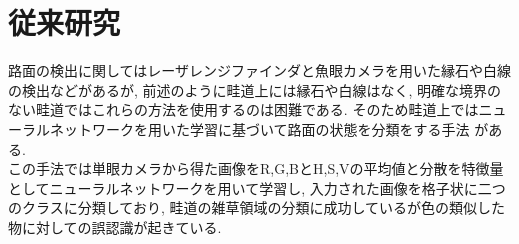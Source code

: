 \section{従来研究}
路面の検出に関してはレーザレンジファインダと魚眼カメラを用いた縁石や白線の検出\cite{土谷千加夫2015自律走行のための白線と縁石に基づく自己位置推定}などがあるが, 
前述のように畦道上には縁石や白線はなく, 明確な境界のない畦道ではこれらの方法を使用するのは困難である. 
そのため畦道上ではニューラルネットワークを用いた学習に基づいて路面の状態を分類をする手法
\cite{長橋孝哉2019ニューラルネットワークを用いた畦道の雑草検出に関する研究}がある.
\\この手法では単眼カメラから得た画像をR,G,BとH,S,Vの平均値と分散を特徴量としてニューラルネットワークを用いて学習し, 
入力された画像を格子状に二つのクラスに分類しており, 畦道の雑草領域の分類に成功しているが色の類似した物に対しての誤認識が起きている.



%
